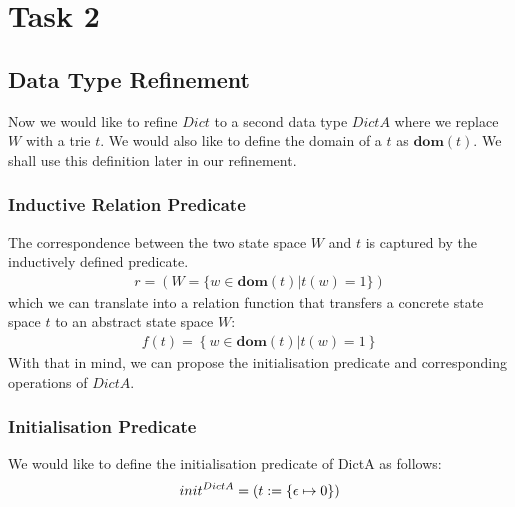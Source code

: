 \documentclass[a4paper,12pt,fleqn]{scrartcl}
\newcommand{\domt}{\textbf{dom}(t)}
\begin{document}
\section{Task 2}
\subsection{Data Type Refinement}
Now we would like to refine $Dict$ to a second data type $DictA$ where we 
replace $W$ with a trie $t$. We would also like to define the domain of a $t$ as
$\domt$. We shall use this definition later in our refinement.
\subsubsection{Inductive Relation Predicate}
The correspondence between the two state space $W$ and $t$ is captured by the 
inductively defined predicate. 
\begin{gather*}
    r = (W = 
    \{ 
        w \in \domt| t(w)=1
    \})
\end{gather*}
which we can translate into a relation function that transfers a concrete 
state space $t$ to an abstract state space $W$:
\begin{gather*}
    f(t) = 
    \left\{
        w \in  \domt | t(w) = 1
    \right\}
\end{gather*}
With that in mind, we can propose the initialisation predicate and corresponding
operations of $DictA$.
\subsubsection{Initialisation Predicate}
We would like to define the initialisation predicate of DictA as follows:
\begin{gather*}
    init^{DictA} = (t\mathrel{:=}\{\epsilon\mapsto 0\}) 
\end{gather*}
\end{document}

